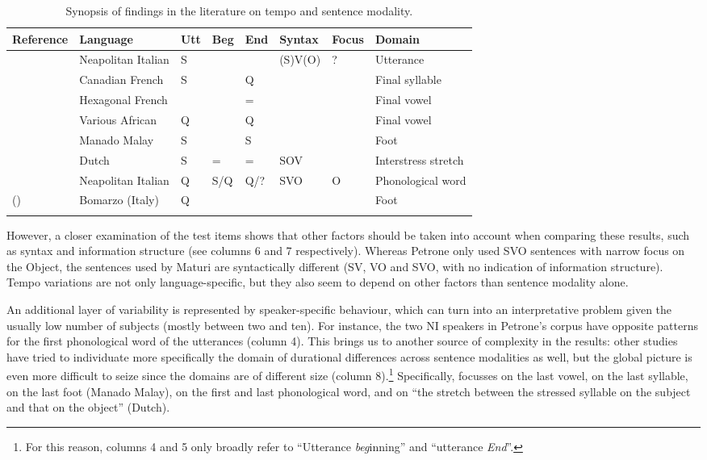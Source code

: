 \begin{table}
\centering\small
\begin{tabular}{m{2.7cm} m{1.4cm} l l l l l m{1.7cm}}
\mytoprule
Reference & Language & Utt & Beg & End & Syntax & Focus & Domain \\
\midrule
\citet{maturi1988intonazione} & Neapolitan Italian & S & & & (S)V(O) & ? & Utterance\\[.3em]
\citet{ryalls1994effects} & Canadian French& S & & Q & & & Final syllable\\[.3em]
\citet{smith2002prosodic} & Hexagonal French & & & = & & & Final vowel \\[.3em]
\citet{rialland2007question} & Various African & Q & & Q & & & Final vowel\\[.3em]
\citet{vanheuven2005speech} & Manado Malay & S & & S & & & Foot \\[.4em]
 & Dutch & S & = & = & SOV & & Interstress stretch \\[.3em]
\citet{petrone2008role} & Neapolitan Italian & Q & S/Q & Q/? & SVO & O & Phonological word\\[.3em]
\mbox{\citeauthor{dedominicis2010interrogative}} (\citeyear{dedominicis2010interrogative}) & Bomarzo (Italy)& Q & & & & & Foot \\[.3em]
\mybottomrule
\end{tabular}
\caption{Synopsis of findings in the literature on tempo and sentence modality.}
\label{tab41}\end{table}

However, a closer examination of the test items shows that other factors should be taken into account when comparing these results, such as syntax and information structure (see columns 6 and 7 respectively). Whereas Petrone only used SVO sentences with narrow focus on the Object, the sentences used by Maturi are syntactically different (SV, VO and SVO, with no indication of information structure). Tempo variations are not only language-specific, but they also seem to depend on other factors than sentence modality alone. 

An additional layer of variability is represented by speaker-specific behaviour, which can turn into an interpretative problem given the usually low number of subjects (mostly between two and ten). For instance, the two NI speakers in Petrone's corpus have opposite patterns for the first phonological word of the utterances (column 4). This brings us to another source of complexity in the results: other studies have tried to individuate more specifically the domain of durational differences across sentence modalities as well, but the global picture is even more difficult to seize since the domains are of different size (column 8).\footnote{For this reason, columns 4 and 5 only broadly refer to ``Utterance \textit{beg}inning'' and ``utterance \textit{End}''.} Specifically, \citet{smith2002prosodic} focusses on the last vowel, \citet{ryalls1994effects} on the last syllable, \citet{vanheuven2005speech} on the last foot (Manado Malay), \citet{petrone2008role} on the first and last phonological word, and \citet{vanheuven2005speech} on 
\enlargethispage{2em}
``the stretch between the stressed syllable on the subject and that on the object'' (Dutch). 

